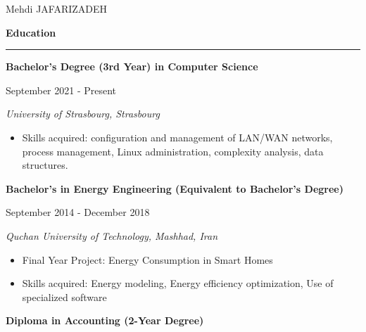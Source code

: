 \documentclass[a4paper]{letter}
\newcommand{\divider}{\rule{\linewidth}{0.9pt}}
\begin{document}
\begin{minipage}[t]{0.67\textwidth}





\setlength{\baselineskip}{1.4\baselineskip}
\vspace{0.7cm}

{\huge Mehdi JAFARIZADEH}

\vspace{0.5cm}

{\large \textbf{Education}}
\divider

{\textbf{Bachelor's Degree (3rd Year) in Computer Science}}

{\footnotesize September 2021 - Present}

{\textit{University of Strasbourg, Strasbourg}}

\vspace{1mm}

\begin{itemize}
    \footnotesize
    \item Skills acquired: configuration and management of LAN/WAN networks,
    process management, Linux administration, complexity analysis, data structures.
\end{itemize}

\vspace{2mm}

{\textbf{Bachelor's in Energy Engineering (Equivalent to Bachelor's Degree)}}

{\footnotesize September 2014 - December 2018}

{\textit{Quchan University of Technology, Mashhad, Iran}}

\vspace{1mm}

\begin{itemize}
    \footnotesize
    \item Final Year Project: Energy Consumption in Smart Homes
    \item Skills acquired: Energy modeling, Energy efficiency optimization, Use of specialized software
\end{itemize}

\vspace{2mm}

{\textbf{Diploma in Accounting (2-Year Degree)}}


\end{minipage}
\end{document}
